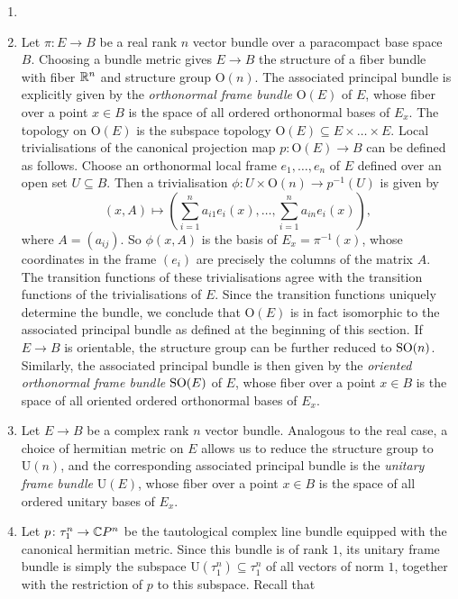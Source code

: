 \begin{example}
    \label{bundles:ex:associated_bundles}
    \begin{enumerate}[label=(\roman*)] 
        \item[] 
        \item \vspace{-.5em} Let $\pi \colon E \to B$ be a real rank $n$ vector bundle over a paracompact base space $B$. Choosing a bundle metric gives $E \to B$ the structure of a fiber bundle with fiber $\mathbb{R}^n$ and structure group $\mathrm{O}(n)$. The associated principal bundle is explicitly given by the \textit{orthonormal frame bundle} $\mathrm{O}(E)$ of $E$, whose fiber over a point $x \in B$ is the space of all ordered orthonormal bases of $E_x$. The topology on $\mathrm{O}(E)$ is the subspace topology $\mathrm{O}(E) \subseteq E \times \ldots \times E$. Local trivialisations of the canonical projection map $p \colon \mathrm{O}(E) \to B$ can be defined as follows. Choose an orthonormal local frame $e_1,\ldots,e_n$ of $E$ defined over an open set $U \subseteq B$. Then a trivialisation $\phi \colon U \times \mathrm{O}(n) \to p^{-1}(U)$ is given by
        \[
            (x,A) \mapsto \left(\sum_{i=1}^n a_{i1}e_i(x),\ldots,\sum_{i=1}^n a_{in}e_i(x)\right),
        \]
        where $A = (a_{ij})$. So $\phi(x,A)$ is the basis of $E_x = \pi^{-1}(x)$, whose coordinates in the frame $(e_i)$ are precisely the columns of the matrix $A$. The transition functions of these trivialisations agree with the transition functions of the trivialisations of $E$. Since the transition functions uniquely determine the bundle, we conclude that $\mathrm{O}(E)$ is in fact isomorphic to the associated principal bundle as defined at the beginning of this section. If $E \to B$ is orientable, the structure group can be further reduced to $\mathrm{SO}(n)$. Similarly, the associated principal bundle is then given by the \textit{oriented orthonormal frame bundle} $\mathrm{SO}(E)$ of $E$, whose fiber over a point $x \in B$ is the space of all oriented ordered orthonormal bases of $E_x$. 
        \item Let $E \to B$ be a complex rank $n$ vector bundle. Analogous to the real case, a choice of hermitian metric on $E$ allows us to reduce the structure group to $\mathrm{U}(n)$, and the corresponding associated principal bundle is the \textit{unitary frame bundle} $\mathrm{U}(E)$, whose fiber over a point $x \in B$ is the space of all ordered unitary bases of $E_x$.
        \item \label{bundles:ex:associated_bundles_cpn} Let $p \colon \tau_1^n \to \mathbb{C} P^n$ be the tautological complex line bundle equipped with the canonical hermitian metric. Since this bundle is of rank $1$, its unitary frame bundle is simply the subspace $\mathrm{U}(\tau_1^n) \subseteq \tau_1^n$ of all vectors of norm $1$, together with the restriction of $p$ to this subspace. Recall that

\end{enumerate}
\end{example}
